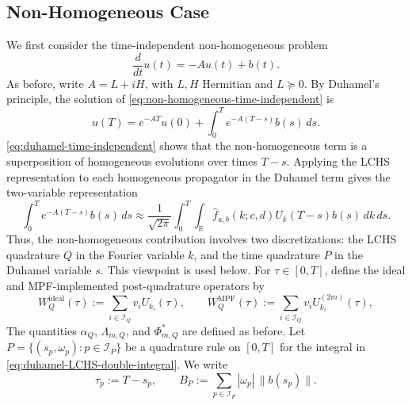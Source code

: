 \documentclass[10pt,reqno]{article}
\numberwithin{equation}{section}
\theoremstyle{plain}
\theoremstyle{definition}
\begin{document}
\subsection{Non-Homogeneous Case}\label{sec:non-homogeneous-extension}
We first consider the time-independent non-homogeneous problem
\begin{equation}\label{eq:non-homogeneous-time-independent}
\frac{d}{dt}u(t)=-Au(t)+b(t).
\end{equation}
As before, write \(A=L+iH\), with \(L,H\) Hermitian and \(L\succeq 0\). By Duhamel's principle, the solution of \cref{eq:non-homogeneous-time-independent} is
\begin{equation}\label{eq:duhamel-time-independent}
u(T)=e^{-AT}u(0)+\int_0^T e^{-A(T-s)}b(s)\,ds.
\end{equation}
\cref{eq:duhamel-time-independent} shows that the non-homogeneous term is a superposition of homogeneous evolutions over times \(T-s\). Applying the LCHS representation to each homogeneous propagator in the Duhamel term gives the two-variable representation
\begin{equation}\label{eq:duhamel-LCHS-double-integral}
\int_0^T e^{-A(T-s)}b(s)\,ds \approx \frac{1}{\sqrt{2\pi}}\int_0^T\int_{\mathbb R}\hat f_{a,b}(k;c,d)U_k(T-s)b(s)\,dk\,ds.
\end{equation}
Thus, the non-homogeneous contribution involves two discretizations: the LCHS quadrature \(Q\) in the Fourier variable \(k\), and the time quadrature \(P\) in the Duhamel variable \(s\). This viewpoint is used below. For \(\tau\in[0,T]\), define the ideal and MPF-implemented post-quadrature operators by
\begin{equation}\label{eq:WQ-tau-ideal-mpf}
W_Q^{\operatorname{ideal}}(\tau):=\sum_{i\in\mathcal I_Q}v_iU_{k_i}(\tau), \qquad W_Q^{\operatorname{MPF}}(\tau):=\sum_{i\in\mathcal I_Q}v_iU^{(2m)}_{k_i}(\tau),
\end{equation}
The quantities \(\alpha_Q\), \(\Lambda_{m,Q}\), and \(\Phi_{m,Q}^{\ast}\) are defined as before. Let \(P=\{(s_p,\omega_p):p\in\mathcal I_P\}\) be a quadrature rule on \([0,T]\) for the integral in \cref{eq:duhamel-LCHS-double-integral}. We write
\begin{equation}
\tau_p:=T-s_p, \qquad B_P:=\sum_{p\in\mathcal I_P}|\omega_p|\,\|b(s_p)\|.
\end{equation}
\end{document}
